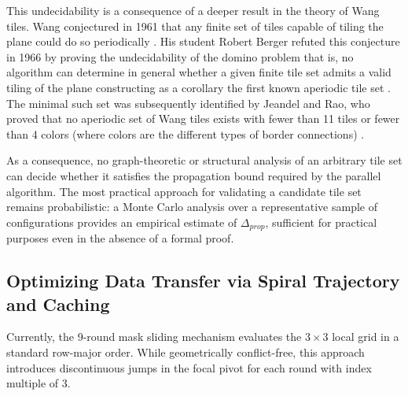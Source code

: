This undecidability is a consequence of a deeper result in the theory of Wang 
tiles. Wang conjectured in 1961 that any finite set of tiles capable of tiling 
the plane could do so periodically \cite{wang1961}. His student Robert Berger 
refuted this conjecture in 1966 by proving the undecidability of the domino 
problem that is, no algorithm can determine in general whether a given finite 
tile set admits a valid tiling of the plane constructing as a corollary the 
first known aperiodic tile set \cite{berger1966}. The minimal such set was 
subsequently identified by Jeandel and Rao, who proved that no aperiodic set 
of Wang tiles exists with fewer than 11 tiles or fewer than 4 
colors (where colors are the different types of border connections) \cite{jeandel2015aperiodic}.

As a consequence, no graph-theoretic or structural analysis of an arbitrary 
tile set can decide whether it satisfies the propagation bound required by 
the parallel algorithm. The most practical approach for validating a candidate 
tile set remains probabilistic: a Monte Carlo analysis over a representative 
sample of configurations provides an empirical estimate of $\Delta_{prop}$, 
sufficient for practical purposes even in the absence of a formal proof.


\subsection{Optimizing Data Transfer via Spiral Trajectory and Caching}

Currently, the 9-round mask sliding mechanism evaluates the $3 \times 3$ local grid in a standard row-major order. While geometrically conflict-free, this approach introduces discontinuous jumps in the focal pivot for each round with index multiple of 3.

